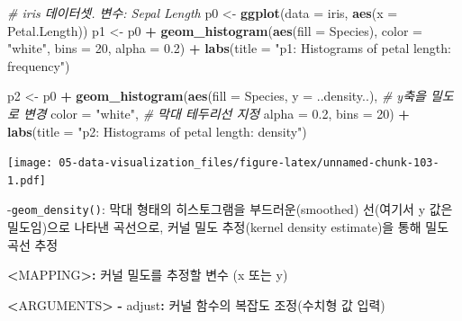 \documentclass[
  11pt,
]{krantz}
\newenvironment{Shaded}{\begin{snugshade}}{\end{snugshade}}
\newcommand{\CommentTok}[1]{\textcolor[rgb]{0.37,0.37,0.37}{\textit{#1}}}
\newcommand{\DataTypeTok}[1]{\textcolor[rgb]{0.27,0.27,0.27}{#1}}
\newcommand{\DecValTok}[1]{\textcolor[rgb]{0.06,0.06,0.06}{#1}}
\newcommand{\ErrorTok}[1]{\textcolor[rgb]{0.14,0.14,0.14}{\textbf{#1}}}
\newcommand{\FloatTok}[1]{\textcolor[rgb]{0.06,0.06,0.06}{#1}}
\newcommand{\KeywordTok}[1]{\textcolor[rgb]{0.27,0.27,0.27}{\textbf{#1}}}
\newcommand{\NormalTok}[1]{#1}
\newcommand{\OperatorTok}[1]{\textcolor[rgb]{0.43,0.43,0.43}{\textbf{#1}}}
\newcommand{\StringTok}[1]{\textcolor[rgb]{0.5,0.5,0.5}{#1}}
\begin{document}
\begin{Shaded}
\begin{Highlighting}[]
\CommentTok{# iris 데이터셋. 변수: Sepal Length}
\NormalTok{p0 <-}\StringTok{ }\KeywordTok{ggplot}\NormalTok{(}\DataTypeTok{data =}\NormalTok{ iris, }\KeywordTok{aes}\NormalTok{(}\DataTypeTok{x =}\NormalTok{ Petal.Length))}
\NormalTok{p1 <-}\StringTok{ }\NormalTok{p0 }\OperatorTok{+}\StringTok{ }
\StringTok{  }\KeywordTok{geom_histogram}\NormalTok{(}\KeywordTok{aes}\NormalTok{(}\DataTypeTok{fill =}\NormalTok{ Species), }
                 \DataTypeTok{color =} \StringTok{"white"}\NormalTok{,}
                 \DataTypeTok{bins =} \DecValTok{20}\NormalTok{, }
                 \DataTypeTok{alpha =} \FloatTok{0.2}\NormalTok{) }\OperatorTok{+}\StringTok{ }
\StringTok{  }\KeywordTok{labs}\NormalTok{(}\DataTypeTok{title =} \StringTok{"p1: Histograms of petal length: frequency"}\NormalTok{)}

\NormalTok{p2 <-}\StringTok{ }\NormalTok{p0 }\OperatorTok{+}\StringTok{ }
\StringTok{  }\KeywordTok{geom_histogram}\NormalTok{(}\KeywordTok{aes}\NormalTok{(}\DataTypeTok{fill =}\NormalTok{ Species, }
                     \DataTypeTok{y =}\NormalTok{ ..density..), }\CommentTok{# y축을 밀도로 변경}
                 \DataTypeTok{color =} \StringTok{"white"}\NormalTok{, }\CommentTok{# 막대 테두리선 지정}
                 \DataTypeTok{alpha =} \FloatTok{0.2}\NormalTok{, }
                 \DataTypeTok{bins =} \DecValTok{20}\NormalTok{) }\OperatorTok{+}\StringTok{  }
\StringTok{  }\KeywordTok{labs}\NormalTok{(}\DataTypeTok{title =} \StringTok{"p2: Histograms of petal length: density"}\NormalTok{)}
\end{Highlighting}
\end{Shaded}

\normalsize

\footnotesize

\texttt{[image: 05-data-visualization\_files/figure-latex/unnamed-chunk-103-1.pdf]}

\normalsize

-\texttt{geom\_density()}: 막대 형태의 히스토그램을 부드러운(smoothed) 선(여기서 y 값은 밀도임)으로 나타낸 곡선으로, 커널 밀도 추정(kernel density estimate)을 통해 밀도 곡선 추정

\footnotesize

\begin{Shaded}
\begin{Highlighting}[]
\OperatorTok{<}\NormalTok{MAPPING}\OperatorTok{>}\ErrorTok{:}\StringTok{ }\NormalTok{커널 밀도를 추정할 변수 (x 또는 y)}

\OperatorTok{<}\NormalTok{ARGUMENTS}\OperatorTok{>}
\StringTok{   }\OperatorTok{-}\StringTok{ }\NormalTok{adjust}\OperatorTok{:}\StringTok{ }\NormalTok{커널 함수의 복잡도 조정(수치형 값 입력)}
\end{Highlighting}
\end{Shaded}
\end{document}
